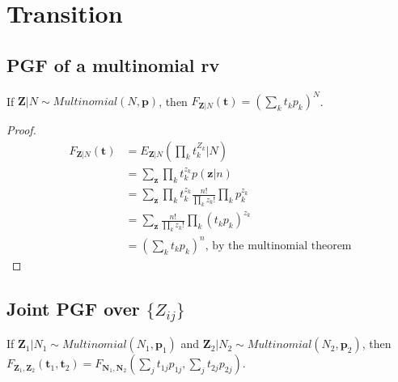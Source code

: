 \documentclass{article}
\begin{document}
\section{Transition}
\subsection{PGF of a multinomial rv}
If $\mathbf{Z}|N \sim Multinomial(N, \mathbf{p})$, then $F_{\mathbf{Z}|N}(\mathbf{t}) = (\sum_k t_k p_k)^N$.

\begin{proof}
\begin{align*}
F_{\mathbf{Z}|N}(\mathbf{t}) &= E_{\mathbf{Z}|N}(\prod_k t_k^{Z_k}|N) \\
&= \sum_\mathbf{z} \prod_k t_k^{z_k} p(\mathbf{z}|n) \\
&= \sum_\mathbf{z} \prod_k t_k^{z_k} \frac{n!}{\prod_k z_k!} \prod_k p_k^{z_k} \\
&= \sum_\mathbf{z} \frac{n!}{\prod_k z_k!} \prod_k (t_k p_k)^{z_k} \\
&= (\sum_k t_k p_k)^n \text{, by the multinomial theorem}
\end{align*}
\end{proof}

\subsection{Joint PGF over $\{Z_{ij}\}$}
If $\mathbf{Z}_1|N_1 \sim Multinomial(N_1, \mathbf{p}_1)$ and $\mathbf{Z}_2|N_2 \sim Multinomial(N_2, \mathbf{p}_2)$, then $F_{\mathbf{Z}_1, \mathbf{Z}_2}(\mathbf{t}_1, \mathbf{t}_2) = F_{\mathbf{N}_1, \mathbf{N}_2}(\sum_j  t_{1j} p_{1j}, \sum_j t_{2j} p_{2j})$.
\end{document}
